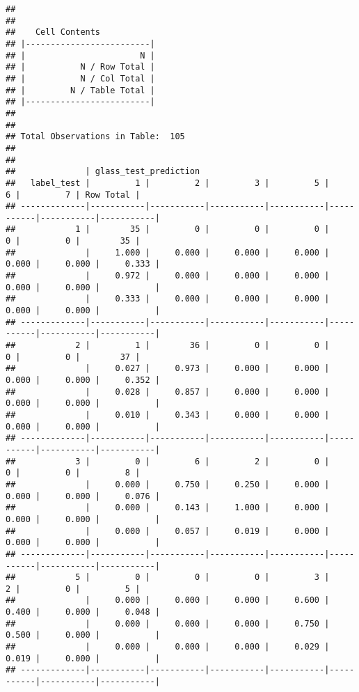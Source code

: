 \documentclass[]{article}
\begin{document}
\begin{verbatim}
## 
##  
##    Cell Contents
## |-------------------------|
## |                       N |
## |           N / Row Total |
## |           N / Col Total |
## |         N / Table Total |
## |-------------------------|
## 
##  
## Total Observations in Table:  105 
## 
##  
##              | glass_test_prediction 
##   label_test |         1 |         2 |         3 |         5 |         6 |         7 | Row Total | 
## -------------|-----------|-----------|-----------|-----------|-----------|-----------|-----------|
##            1 |        35 |         0 |         0 |         0 |         0 |         0 |        35 | 
##              |     1.000 |     0.000 |     0.000 |     0.000 |     0.000 |     0.000 |     0.333 | 
##              |     0.972 |     0.000 |     0.000 |     0.000 |     0.000 |     0.000 |           | 
##              |     0.333 |     0.000 |     0.000 |     0.000 |     0.000 |     0.000 |           | 
## -------------|-----------|-----------|-----------|-----------|-----------|-----------|-----------|
##            2 |         1 |        36 |         0 |         0 |         0 |         0 |        37 | 
##              |     0.027 |     0.973 |     0.000 |     0.000 |     0.000 |     0.000 |     0.352 | 
##              |     0.028 |     0.857 |     0.000 |     0.000 |     0.000 |     0.000 |           | 
##              |     0.010 |     0.343 |     0.000 |     0.000 |     0.000 |     0.000 |           | 
## -------------|-----------|-----------|-----------|-----------|-----------|-----------|-----------|
##            3 |         0 |         6 |         2 |         0 |         0 |         0 |         8 | 
##              |     0.000 |     0.750 |     0.250 |     0.000 |     0.000 |     0.000 |     0.076 | 
##              |     0.000 |     0.143 |     1.000 |     0.000 |     0.000 |     0.000 |           | 
##              |     0.000 |     0.057 |     0.019 |     0.000 |     0.000 |     0.000 |           | 
## -------------|-----------|-----------|-----------|-----------|-----------|-----------|-----------|
##            5 |         0 |         0 |         0 |         3 |         2 |         0 |         5 | 
##              |     0.000 |     0.000 |     0.000 |     0.600 |     0.400 |     0.000 |     0.048 | 
##              |     0.000 |     0.000 |     0.000 |     0.750 |     0.500 |     0.000 |           | 
##              |     0.000 |     0.000 |     0.000 |     0.029 |     0.019 |     0.000 |           | 
## -------------|-----------|-----------|-----------|-----------|-----------|-----------|-----------|

\end{verbatim}
\end{document}
